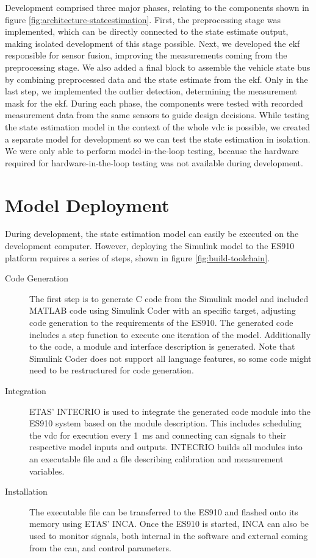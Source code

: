 Development comprised three major phases, relating to the components shown in figure \ref{fig:architecture-stateestimation}. First, the preprocessing stage was implemented, which can be directly connected to the state estimate output, making isolated development of this stage possible. Next, we developed the \gls{ekf} responsible for sensor fusion, improving the measurements coming from the preprocessing stage. We also added a final block to assemble the vehicle state bus by combining preprocessed data and the state estimate from the \gls{ekf}. Only in the last step, we implemented the outlier detection, determining the measurement mask for the \gls{ekf}. During each phase, the components were tested with recorded measurement data from the same sensors to guide design decisions. While testing the state estimation model in the context of the whole \gls{vdc} is possible, we created a separate model for development so we can test the state estimation in isolation. We were only able to perform model-in-the-loop testing, because the hardware required for hardware-in-the-loop testing was not available during development.


\section{Model Deployment}
During development, the state estimation model can easily be executed on the development computer. However, deploying the Simulink model to the ES910 platform requires a series of steps, shown in figure \ref{fig:build-toolchain}.

\begin{description}
\item[Code Generation] The first step is to generate C code from the Simulink model and included MATLAB code using Simulink Coder with an specific target, adjusting code generation to the requirements of the ES910. The generated code includes a step function to execute one iteration of the model. Additionally to the code, a module and interface description is generated. Note that Simulink Coder does not support all language features, so some code might need to be restructured for code generation.

\item[Integration] ETAS' INTECRIO is used to integrate the generated code module into the ES910 system based on the module description. This includes scheduling the \gls{vdc} for execution every \SI{1}{\milli\second} and connecting \gls{can} signals to their respective model inputs and outputs. INTECRIO builds all modules into an executable file and a file describing calibration and measurement variables.

\item[Installation] The executable file can be transferred to the ES910 and flashed onto its memory using ETAS' INCA. Once the ES910 is started, INCA can also be used to monitor signals, both internal in the software and external coming from the \gls{can}, and control parameters.
\end{description}

